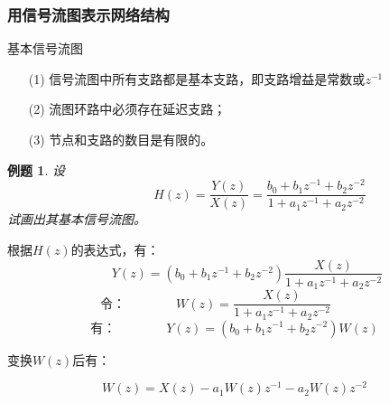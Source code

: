 \documentclass[notheorems,compress,mathserif,table]{beamer}
\newtheorem{example}{例题}
\begin{document}
\begin{frame}[allowframebreaks]\frametitle{用信号流图表示网络结构}%
{\heiti 基本信号流图}
\begin{enumerate}
  \item [(1)] 信号流图中所有支路都是基本支路，即支路增益是常数或$z^{-1}$
  \item [(2)] 流图环路中必须存在延迟支路；
  \item [(3)] 节点和支路的数目是有限的。
\end{enumerate}

\begin{example}
\label{exam:ch5exam1}
设%
$$\quad\quad\quad\quad H(z)=\frac{Y(z)}{X(z)}= \frac{b_0+b_1z^{-1}+b_2z^{-2}}{1+a_1z^{-1}+a_2z^{-2}}$$
试画出其基本信号流图。
\end{example}
\newpage
根据$H(z)$的表达式，有：
$$\quad\quad           Y(z)=(b_0+b_1z^{-1}+b_2z^{-2})\frac{X(z)}{1+a_1z^{-1}+a_2z^{-2}}$$
$$\mbox{令：}\quad\quad\quad\quad W(z)=\frac{X(z)}{1+a_1z^{-1}+a_2z^{-2}}\quad\quad\quad$$
$$\mbox{有：}\quad\quad\quad\quad Y(z)=(b_0+b_1z^{-1}+b_2z^{-2})W(z)$$

变换$W(z)$后有：

$$W(z)=X(z)-a_1W(z)z^{-1}-a_2W(z)z^{-2}$$

\end{frame}
\end{document}
